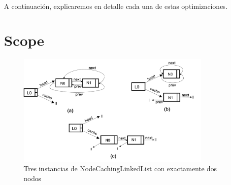 

A continuación, explicaremos en detalle cada una de estas optimizaciones.

   



\section{Scope}
\label{sec:scope}

\begin{figure}[H]
    \centering
    \includegraphics[width=0.85\textwidth]{images/NCL-instances.png}
    \caption{Tres instancias de NodeCachingLinkedList con exactamente dos nodos}
    \label{fig:ncl-instances}
\end{figure}



